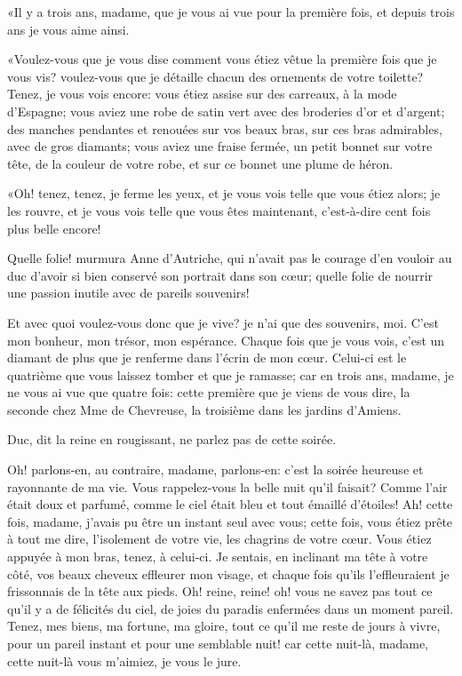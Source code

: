 «Il y a trois ans, madame, que je vous ai vue pour la première fois, et depuis trois ans je vous aime ainsi. 

«Voulez-vous que je vous dise comment vous étiez vêtue la première fois que je vous vis? voulez-vous que je détaille chacun des ornements de votre toilette? Tenez, je vous vois encore: vous étiez assise sur des carreaux, à la mode d'Espagne; vous aviez une robe de satin vert avec des broderies d'or et d'argent; des manches pendantes et renouées sur vos beaux bras, sur ces bras admirables, avec de gros diamants; vous aviez une fraise fermée, un petit bonnet sur votre tête, de la couleur de votre robe, et sur ce bonnet une plume de héron. 

«Oh! tenez, tenez, je ferme les yeux, et je vous vois telle que vous étiez alors; je les rouvre, et je vous vois telle que vous êtes maintenant, c'est-à-dire cent fois plus belle encore! 

\speak  Quelle folie! murmura Anne d'Autriche, qui n'avait pas le courage d'en vouloir au duc d'avoir si bien conservé son portrait dans son cœur; quelle folie de nourrir une passion inutile avec de pareils souvenirs! 

\speak  Et avec quoi voulez-vous donc que je vive? je n'ai que des souvenirs, moi. C'est mon bonheur, mon trésor, mon espérance. Chaque fois que je vous vois, c'est un diamant de plus que je renferme dans l'écrin de mon cœur. Celui-ci est le quatrième que vous laissez tomber et que je ramasse; car en trois ans, madame, je ne vous ai vue que quatre fois: cette première que je viens de vous dire, la seconde chez Mme de Chevreuse, la troisième dans les jardins d'Amiens. 

\speak  Duc, dit la reine en rougissant, ne parlez pas de cette soirée. 

\speak  Oh! parlons-en, au contraire, madame, parlons-en: c'est la soirée heureuse et rayonnante de ma vie. Vous rappelez-vous la belle nuit qu'il faisait? Comme l'air était doux et parfumé, comme le ciel était bleu et tout émaillé d'étoiles! Ah! cette fois, madame, j'avais pu être un instant seul avec vous; cette fois, vous étiez prête à tout me dire, l'isolement de votre vie, les chagrins de votre cœur. Vous étiez appuyée à mon bras, tenez, à celui-ci. Je sentais, en inclinant ma tête à votre côté, vos beaux cheveux effleurer mon visage, et chaque fois qu'ils l'effleuraient je frissonnais de la tête aux pieds. Oh! reine, reine! oh! vous ne savez pas tout ce qu'il y a de félicités du ciel, de joies du paradis enfermées dans un moment pareil. Tenez, mes biens, ma fortune, ma gloire, tout ce qu'il me reste de jours à vivre, pour un pareil instant et pour une semblable nuit! car cette nuit-là, madame, cette nuit-là vous m'aimiez, je vous le jure. 

